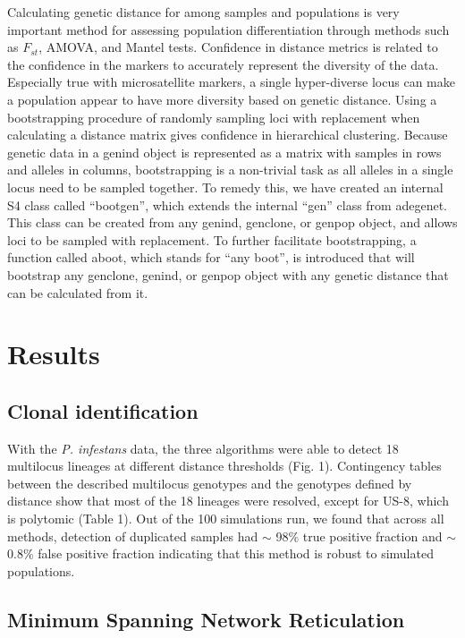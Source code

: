 \documentclass{frontiersSCNS} %
\begin{document}
Calculating genetic distance for among samples and populations is very
important method for assessing population differentiation through
methods such as \(F_{st}\), AMOVA, and Mantel tests. Confidence in
distance metrics is related to the confidence in the markers to
accurately represent the diversity of the data. Especially true with
microsatellite markers, a single hyper-diverse locus can make a
population appear to have more diversity based on genetic distance.
Using a bootstrapping procedure of randomly sampling loci with
replacement when calculating a distance matrix gives confidence in
hierarchical clustering. Because genetic data in a genind object is
represented as a matrix with samples in rows and alleles in columns,
bootstrapping is a non-trivial task as all alleles in a single locus
need to be sampled together. To remedy this, we have created an internal
S4 class called ``bootgen'', which extends the internal ``gen'' class
from adegenet. This class can be created from any genind, genclone, or
genpop object, and allows loci to be sampled with replacement. To
further facilitate bootstrapping, a function called aboot, which stands
for ``any boot'', is introduced that will bootstrap any genclone,
genind, or genpop object with any genetic distance that can be
calculated from it.

\section*{Results}\label{results}

\subsection*{Clonal identification}\label{clonal-identification-1}

With the \emph{P. infestans} data, the three algorithms were able to
detect 18 multilocus lineages at different distance thresholds (Fig. 1).
Contingency tables between the described multilocus genotypes and the
genotypes defined by distance show that most of the 18 lineages were
resolved, except for US-8, which is polytomic (Table 1). Out of the 100
simulations run, we found that across all methods, detection of
duplicated samples had \(\sim\) 98\% true positive fraction and \(\sim\)
0.8\% false positive fraction indicating that this method is robust to
simulated populations.

\subsection*{Minimum Spanning Network
Reticulation}\label{minimum-spanning-network-reticulation}
\end{document}
